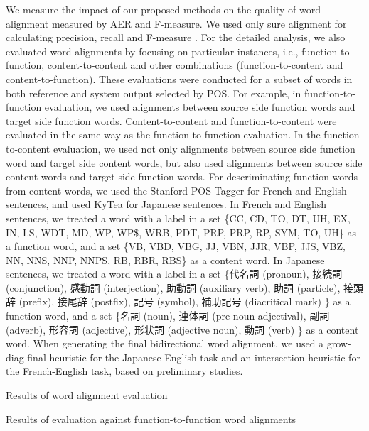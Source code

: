 \documentclass[english]{jnlp_1.4}
\begin{document}
We measure the impact of our proposed methods on the quality of word alignment measured by AER \cite{och2003systematic} and F-measure.
We used only sure alignment for calculating precision, recall and F-measure \cite{fraser2007measuring}.
For the detailed analysis, we also evaluated word alignments by focusing on particular instances, i.e., function-to-function, content-to-content and other combinations (function-to-content and content-to-function).
These evaluations were conducted for a subset of words in both reference and system output selected by POS.
For example, in function-to-function evaluation, we used alignments between source side function words and target side function words.
Content-to-content and function-to-content were evaluated in the same way as the function-to-function evaluation.
In the function-to-content evaluation, we used not only alignments between source side function word and target side content words, but also used alignments between source side content words and target side function words.
For descriminating function words from content words, we used the Stanford POS Tagger \cite{N03-1033} for French and English sentences,
and used KyTea \cite{P11-2093} for Japanese sentences. 
In French and English sentences, we treated a word with a label in a set \{CC, CD, TO, DT, UH, EX, IN, LS, WDT, MD, WP, WP\$, WRB, PDT, PRP, PRP, RP, SYM, TO, UH\} as a function word,
and a set \{VB, VBD, VBG, JJ, VBN, JJR, VBP, JJS, VBZ, NN, NNS, NNP, NNPS, RB, RBR, RBS\} as a content word.
In Japanese sentences, we treated a word with a label in a set \{代名詞 (pronoun), 接続詞 (conjunction), 感動詞 (interjection), 助動詞 (auxiliary verb), 助詞 (particle), 接頭辞 (prefix), 接尾辞 (postfix), 記号 (symbol), 補助記号 (diacritical mark) \} as a function word,
and a set \{名詞 (noun), 連体詞 (pre-noun adjectival), 副詞 (adverb), 形容詞 (adjective), 形状詞 (adjective noun), 動詞 (verb) \} as a content word.
When generating the final bidirectional word alignment,
we used a grow-diag-final heuristic \cite{och2003systematic} for the Japanese-English task and an intersection heuristic for the French-English task,
based on preliminary studies.

\begin{table}[b]
  \caption{Results of word alignment evaluation}
 \label{kfttalign}

\end{table}

\begin{table}[b]
  \caption{Results of evaluation against function-to-function word alignments}
 \label{alignment:f2f}

\end{table}
\end{document}
